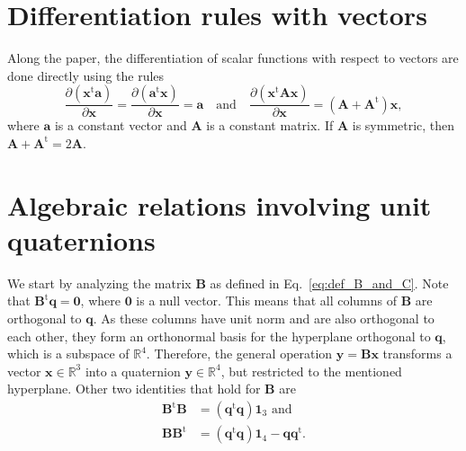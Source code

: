 \documentclass[aip,jcp,reprint,amsmath,amssymb]{revtex4-1}
\newcommand{\mt}[1]{\boldsymbol{\mathbf{#1}}}           %
\newcommand{\vt}[1]{\boldsymbol{\mathbf{#1}}}           %
\newcommand{\tr}[1]{#1^\text{t}}                               %
\newcommand{\diff}[2]{\dfrac{\partial #1}{\partial #2}} %
\begin{document}
\section{Differentiation rules with vectors}
\label{sec:Diff_Rules}

Along the paper, the differentiation of scalar functions with respect to vectors are done directly using the rules
\[
\diff{(\tr{\vt x}\vt a)}{\vt x} = \diff{(\tr{\vt a}\vt x)}{\vt x} = \vt a \quad \text{and} \quad \diff{(\tr{\vt x}\mt A \vt x)}{\vt x} = (\mt A + \tr{\mt A})\vt x,
\]
where $\vt a$ is a constant vector and $\mt A$ is a constant matrix. If $\mt A$ is symmetric, then $\mt A + \tr{\mt A} = 2\mt A$.

\section{Algebraic relations involving unit quaternions}
\label{sec:auxiliary_math}

We start by analyzing the matrix $\mt B$ as defined in Eq.~\ref{eq:def_B_and_C}. Note that $\tr{\mt B}\vt q = \vt 0$, where $\vt 0$ is a null vector.\cite{Haug1989, Shuster1993, Dichmann1999} This means that all columns of $\mt B$ are orthogonal to $\vt q$. As these columns have unit norm and are also orthogonal to each other, they form an orthonormal basis for the hyperplane orthogonal to $\mt q$, which is a subspace of $\mathbb{R}^4$. Therefore, the general operation $\vt y = \mt B \vt x$ transforms a vector $\vt x \in \mathbb{R}^3$ into a quaternion $\vt y \in \mathbb{R}^4$, but restricted to the mentioned hyperplane. Other two identities that hold for $\mt B$ are\citep{Haug1989}
\begin{equation}
\label{eq:basics_B}
\begin{aligned}
\tr{\mt B}\mt B &= (\tr{\vt q}{\vt q}) {\mt 1}_3 \text{ and} \\
\mt B\tr{\mt B} &= (\tr{\vt q}{\vt q}) {\mt 1}_4 - {\vt q}\tr{\vt q}.
\end{aligned}
\end{equation}
\end{document}

